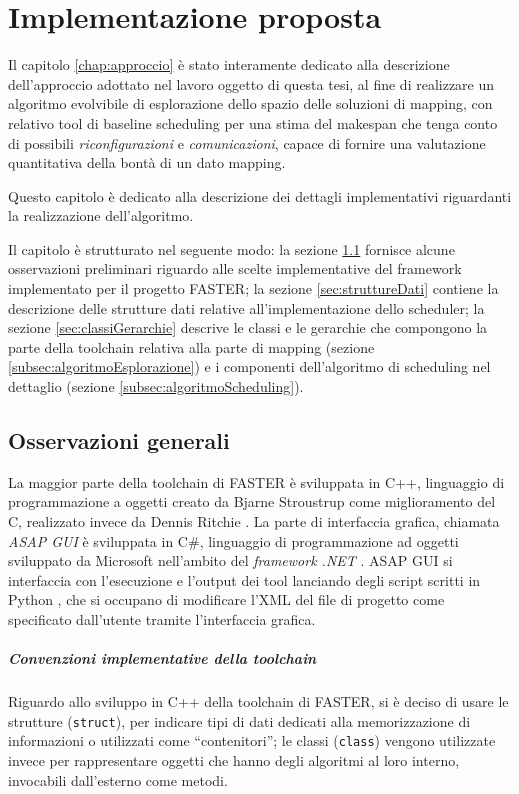 \chapter{Implementazione proposta}
\label{chap:implementazione}
\vspace{1cm}
Il capitolo \ref{chap:approccio} è stato interamente dedicato alla descrizione 
dell'approccio adottato nel lavoro oggetto di questa tesi, al fine di 
realizzare un algoritmo evolvibile di esplorazione dello spazio delle soluzioni di mapping,
con relativo tool di baseline scheduling per una stima del makespan che tenga conto di possibili 
\emph{riconfigurazioni} e \emph{comunicazioni}, capace di fornire una 
valutazione quantitativa della bontà di un dato mapping.

Questo capitolo è dedicato alla descrizione dei dettagli implementativi 
riguardanti la realizzazione dell'algoritmo.

Il capitolo è strutturato nel seguente modo: la sezione 
\ref{sec:osservazioniGenerali} fornisce alcune osservazioni preliminari 
riguardo alle scelte implementative del framework implementato per il
progetto \ac{FASTER}; la sezione 
\ref{sec:struttureDati} contiene la descrizione delle strutture dati relative 
all'implementazione dello scheduler; la sezione \ref{sec:classiGerarchie} 
descrive le classi e le gerarchie che compongono la parte della toolchain 
relativa alla parte di mapping (sezione 
\ref{subsec:algoritmoEsplorazione}) e i componenti dell'algoritmo di scheduling 
nel dettaglio (sezione \ref{subsec:algoritmoScheduling}).

\section{Osservazioni generali}
\label{sec:osservazioniGenerali}
La maggior parte della toolchain di \ac{FASTER} è sviluppata in C++, 
linguaggio di programmazione a oggetti creato da Bjarne Stroustrup 
\cite{CppStroustrup} come miglioramento del C, realizzato invece da Dennis Ritchie 
\cite{CKernighanRitchie}. La parte di interfaccia grafica, chiamata \emph{ASAP 
GUI} è sviluppata in C\#, linguaggio di programmazione ad oggetti sviluppato da 
Microsoft nell'ambito del \emph{framework .NET} \cite{ProCSharp}. ASAP GUI 
si interfaccia con l'esecuzione e l'output dei tool lanciando degli script scritti
in Python \cite{ThinkPython}, che si occupano di modificare l'XML del file di progetto
come specificato dall'utente tramite l'interfaccia grafica.
\paragraph{Convenzioni implementative della toolchain}
Riguardo allo sviluppo in C++ della toolchain di \ac{FASTER}, si è deciso di 
usare le strutture (\verb+struct+), per indicare tipi di dati dedicati alla 
memorizzazione di informazioni o utilizzati come ``contenitori''; le classi 
(\verb+class+) vengono utilizzate invece per rappresentare oggetti che hanno 
degli algoritmi al loro interno, invocabili dall'esterno come metodi.


